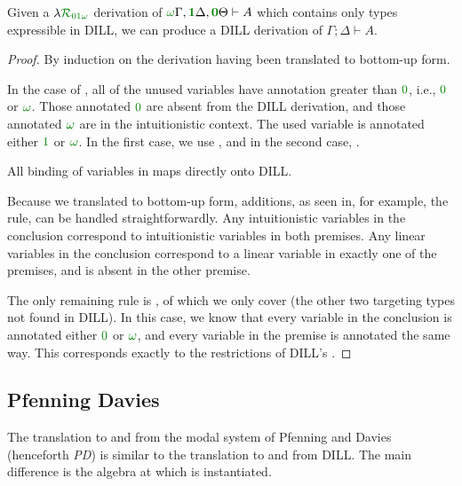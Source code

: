 \documentclass[submission,copyright,creativecommons]{eptcs}
\begin{document}
\begin{proposition}
  Given a $\name_{\instDILL}$ derivation of
  $\ctx{\Gamma}{\vct\unrestricted}, \ctx{\Delta}{\vct\linear},
  \ctx{\Theta}{\vct\zero} \vdash A$ which contains only types expressible
  in DILL, we can produce a DILL derivation of $\Gamma; \Delta \vdash A$.
\end{proposition}
\begin{proof}
  By induction on the derivation having been translated to bottom-up form.

  In the case of , all of the unused variables have annotation
  greater than $\zero$, i.e., $\zero$ or $\unrestricted$.
  Those annotated $\zero$ are absent from the DILL derivation, and those
  annotated $\unrestricted$ are in the intuitionistic context.
  The used variable is annotated either $\linear$ or $\unrestricted$.
  In the first case, we use , and in the second case,
  .

  All binding of variables in \name{} maps directly onto DILL.

  Because we translated to bottom-up form, additions, as seen in, for example,
  the  rule, can be handled straightforwardly.
  Any intuitionistic variables in the conclusion correspond to intuitionistic
  variables in both premises.
  Any linear variables in the conclusion correspond to a linear variable in
  exactly one of the premises, and is absent in the other premise.

  The only remaining rule is , of which we only cover
   (the other two targeting types not found
  in DILL).
  In this case, we know that every variable in the conclusion is annotated
  either $\zero$ or $\unrestricted$, and every variable in the premise is
  annotated the same way.
  This corresponds exactly to the restrictions of DILL's .
\end{proof}

\subsection{Pfenning Davies}\label{sec:pd}

The translation to and from the modal system of Pfenning and Davies
\cite{judgmental} (henceforth \emph{PD}) is similar to the translation to and
from DILL.
The main difference is the algebra at which \name{} is instantiated.
\end{document}
